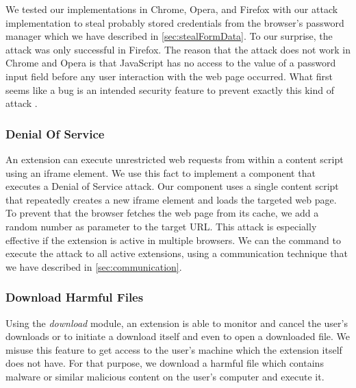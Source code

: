	We tested our implementations in Chrome, Opera, and Firefox with our attack implementation to steal probably stored credentials from the browser's password manager which we have described in \autoref{sec:stealFormData}. To our surprise, the attack was only successful in Firefox. The reason that the attack does not work in Chrome and Opera is that JavaScript has no access to the value of a password input field before any user interaction with the web page occurred. What first seems like a bug is an intended security feature to prevent exactly this kind of attack \cite{chromiumBlogPasswordInput}.


\subsubsection{Denial Of Service}
\label{sec:DoS}
	
	An extension can execute unrestricted web requests from within a content script using an iframe element. We use this fact to implement a component that executes a Denial of Service attack. Our component uses a single content script that repeatedly creates a new iframe element and loads the targeted web page. To prevent that the browser fetches the web page from its cache, we add a random number as parameter to the target URL. This attack is especially effective if the extension is active in multiple browsers. We can the command to execute the attack to all active extensions, using a communication technique that we have described in \autoref{sec:communication}.

\subsubsection{Download Harmful Files}
\label{sec:downloads}

	Using the \textit{download} module, an extension is able to monitor and cancel the user's downloads or to initiate a download itself and even to open a downloaded file. We misuse this feature to get access to the user's machine which the extension itself does not have. For that purpose, we download a harmful file which contains malware or similar malicious content on the user's computer and execute it. 
	
